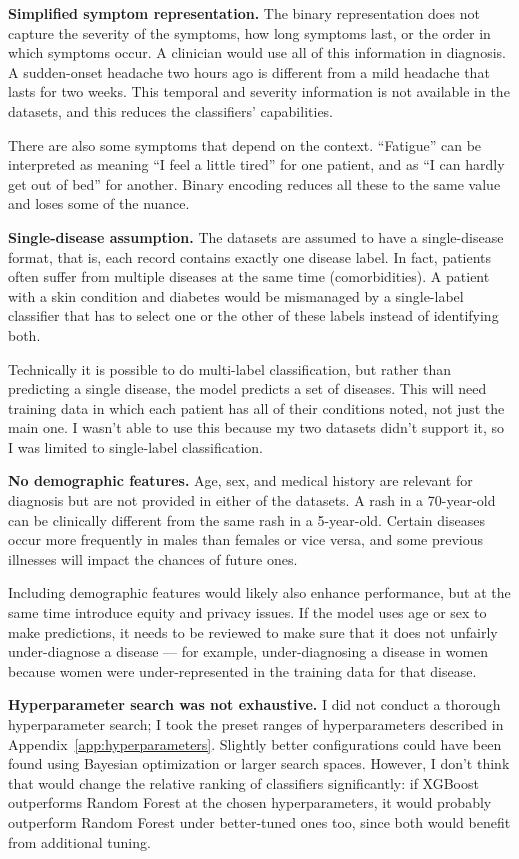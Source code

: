 \textbf{Simplified symptom representation.} The binary representation does not capture the severity of the symptoms, how long symptoms last, or the order in which symptoms occur. A clinician would use all of this information in diagnosis. A sudden-onset headache two hours ago is different from a mild headache that lasts for two weeks. This temporal and severity information is not available in the datasets, and this reduces the classifiers' capabilities.

There are also some symptoms that depend on the context. ``Fatigue'' can be interpreted as meaning ``I feel a little tired'' for one patient, and as ``I can hardly get out of bed'' for another. Binary encoding reduces all these to the same value and loses some of the nuance.

\textbf{Single-disease assumption.} The datasets are assumed to have a single-disease format, that is, each record contains exactly one disease label. In fact, patients often suffer from multiple diseases at the same time (comorbidities). A patient with a skin condition and diabetes would be mismanaged by a single-label classifier that has to select one or the other of these labels instead of identifying both.

Technically it is possible to do multi-label classification, but rather than predicting a single disease, the model predicts a set of diseases. This will need training data in which each patient has all of their conditions noted, not just the main one. I wasn't able to use this because my two datasets didn't support it, so I was limited to single-label classification.

\textbf{No demographic features.} Age, sex, and medical history are relevant for diagnosis but are not provided in either of the datasets. A rash in a 70-year-old can be clinically different from the same rash in a 5-year-old. Certain diseases occur more frequently in males than females or vice versa, and some previous illnesses will impact the chances of future ones.

Including demographic features would likely also enhance performance, but at the same time introduce equity and privacy issues. If the model uses age or sex to make predictions, it needs to be reviewed to make sure that it does not unfairly under-diagnose a disease --- for example, under-diagnosing a disease in women because women were under-represented in the training data for that disease.

\textbf{Hyperparameter search was not exhaustive.} I did not conduct a thorough hyperparameter search; I took the preset ranges of hyperparameters described in Appendix~\ref{app:hyperparameters}. Slightly better configurations could have been found using Bayesian optimization or larger search spaces. However, I don't think that would change the relative ranking of classifiers significantly: if XGBoost outperforms Random Forest at the chosen hyperparameters, it would probably outperform Random Forest under better-tuned ones too, since both would benefit from additional tuning.

